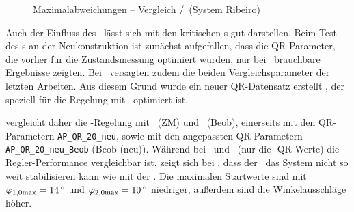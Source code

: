 \begin{figure}[htbp]
	\caption{Maximalabweichungen -- Vergleich \zm/\beob\ (System Ribeiro)}
	\label{fig:vglribze}
\end{figure}

Auch der Einfluss des \beob\ lässt sich mit den kritischen \xots s gut darstellen.
Beim Test des \beob s an der Neukonstruktion ist zunächst aufgefallen, dass die QR-Parameter, die vorher für die Zustandsmessung optimiert wurden, nur bei \apz\ brauchbare Ergebnisse zeigten.
Bei \apv\ versagten zudem die beiden Vergleichsparameter der letzten Arbeiten.
Aus diesem Grund wurde ein neuer QR-Datensatz erstellt , der speziell für die Regelung mit \beob\ optimiert ist.

 vergleicht daher die \ap-Regelung mit \zm\ (ZM) und \beob\ (Beob), einerseits mit den QR-Parametern \texttt{AP\_QR\_20\_neu}, sowie mit den angepassten QR-Parametern \texttt{AP\_QR\_20\_neu\_Beob} (Beob (neu)).
Während bei \apz\ und \apd\ (nur die \beob-QR-Werte) die Regler-Performance vergleichbar ist, zeigt sich bei \apv, dass der \beob\ das System nicht so weit stabilisieren kann wie mit der \zm. 
Die maximalen Startwerte sind mit $\varphi_{1,0\mrm{max}}=\valdeg{14}$ und $\varphi_{2,0\mrm{max}}=\valdeg{10}$ niedriger, außerdem sind die Winkelausschläge höher.




